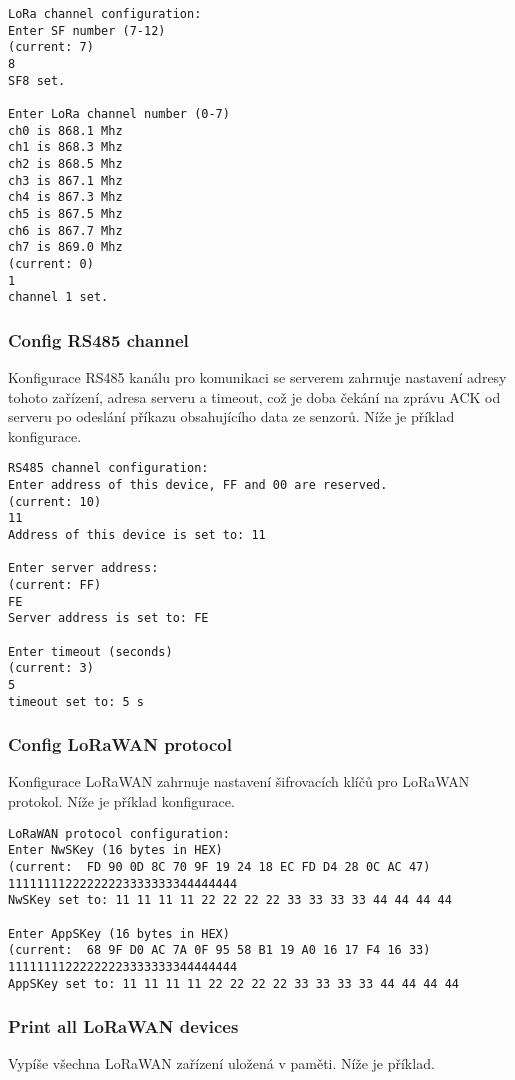 \begin{lstlisting}
LoRa channel configuration:
Enter SF number (7-12)
(current: 7)
8
SF8 set.

Enter LoRa channel number (0-7)
ch0 is 868.1 Mhz
ch1 is 868.3 Mhz
ch2 is 868.5 Mhz
ch3 is 867.1 Mhz
ch4 is 867.3 Mhz
ch5 is 867.5 Mhz
ch6 is 867.7 Mhz
ch7 is 869.0 Mhz
(current: 0)
1
channel 1 set.
\end{lstlisting}


\subsubsection{Config RS485 channel}
Konfigurace RS485 kanálu pro komunikaci se serverem zahrnuje nastavení adresy tohoto zařízení, adresa serveru a timeout, což je doba čekání na zprávu ACK od serveru po odeslání příkazu obsahujícího data ze senzorů. Níže je příklad konfigurace.

\begin{lstlisting}
RS485 channel configuration:
Enter address of this device, FF and 00 are reserved.
(current: 10)
11
Address of this device is set to: 11

Enter server address: 
(current: FF)
FE
Server address is set to: FE

Enter timeout (seconds)
(current: 3)
5
timeout set to: 5 s
\end{lstlisting}


\subsubsection{Config LoRaWAN protocol}
Konfigurace LoRaWAN zahrnuje nastavení šifrovacích klíčů pro LoRaWAN protokol. Níže je příklad konfigurace.

\begin{lstlisting}
LoRaWAN protocol configuration:
Enter NwSKey (16 bytes in HEX)
(current:  FD 90 0D 8C 70 9F 19 24 18 EC FD D4 28 0C AC 47)
11111111222222223333333344444444
NwSKey set to: 11 11 11 11 22 22 22 22 33 33 33 33 44 44 44 44

Enter AppSKey (16 bytes in HEX)
(current:  68 9F D0 AC 7A 0F 95 58 B1 19 A0 16 17 F4 16 33)
11111111222222223333333344444444
AppSKey set to: 11 11 11 11 22 22 22 22 33 33 33 33 44 44 44 44
\end{lstlisting}




\subsubsection{Print all LoRaWAN devices}
Vypíše všechna LoRaWAN zařízení uložená v paměti. Níže je příklad.


